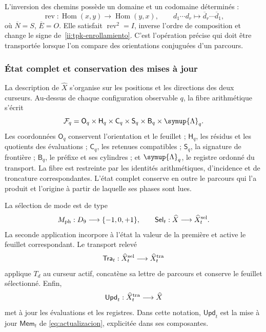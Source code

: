 L'inversion des chemins possède un domaine et un codomaine déterminés :
\[
 \operatorname{rev}:\operatorname{Hom}(x,y)
 \longrightarrow\operatorname{Hom}(y,x),\qquad
 d_1\cdots d_r\longmapsto\overline d_r\cdots\overline d_1,
\]
où \(\overline N=S\), \(\overline E=O\). Elle satisfait \(\operatorname{rev}^2=I\), inverse l'ordre de composition et change le signe de~\eqref{ii:tpk-enrollamiento}. C'est l'opération précise qui doit être transportée lorsque l'on compare des orientations conjuguées d'un parcours.

\subsubsection{État complet et conservation des mises à jour}

La description de \(\widehat X\) s'organise sur les positions et les directions des deux curseurs. Au-dessus de chaque configuration observable \(q\), la fibre arithmétique s'écrit
\begin{equation}
 \mathcal F_q=
 \mathsf O_q\times\mathsf H_q\times\mathsf C_q\times
 \mathsf S_q\times\mathsf B_q\times\symup{\Lambda}_q.
 \label{ii:tpk-fibra}
\end{equation}
Les coordonnées \(\mathsf O_q\) conservent l'orientation et le feuillet ; \(\mathsf H_q\), les résidus et les quotients des évaluations ; \(\mathsf C_q\), les retenues compatibles ; \(\mathsf S_q\), la signature de frontière ; \(\mathsf B_q\), le préfixe et ses cylindres ; et \(\symup{\Lambda}_q\), le registre ordonné du transport. La fibre est restreinte par les identités arithmétiques, d'incidence et de troncature correspondantes. L'état complet conserve en outre le parcours qui l'a produit et l'origine à partir de laquelle ses phases sont lues.

La sélection de mode est de type
\[
 M_{\rm ph}:D_9\longrightarrow\{-1,0,+1\},\qquad
 \mathsf{Sel}_t:\widehat X\longrightarrow\widehat X^{\rm sel}_t.
\]
La seconde application incorpore à l'état la valeur de la première et active le feuillet correspondant. Le transport relevé
\[
 \mathsf{Tra}_t:\widehat X^{\rm sel}_t
 \longrightarrow\widehat X^{\rm tra}_t
\]
applique \(T_d\) au curseur actif, concatène sa lettre de parcours et conserve le feuillet sélectionné. Enfin,
\[
 \mathsf{Upd}_t:\widehat X^{\rm tra}_t\longrightarrow\widehat X
\]
met à jour les évaluations et les registres. Dans cette notation, \(\mathsf{Upd}_t\) est la mise à jour \(\mathsf{Mem}_t\) de \eqref{eq:actualizacion}, explicitée dans ses composantes.

